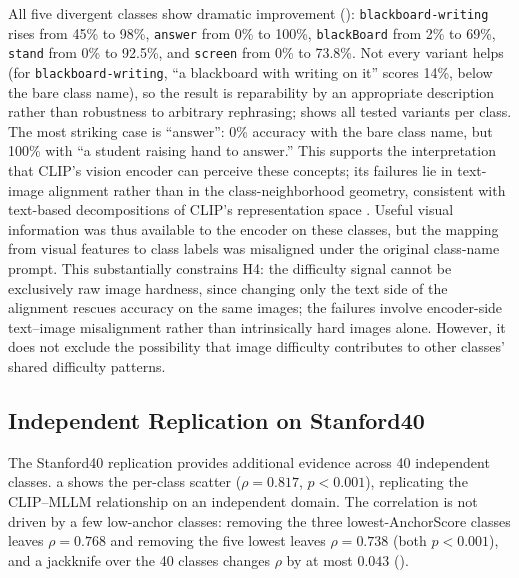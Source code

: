 \documentclass[a4paper,fleqn]{cas-sc}
\begin{document}
All five divergent classes show dramatic improvement (): \texttt{blackboard-writing} rises from 45\% to 98\%, \texttt{answer} from 0\% to 100\%, \texttt{blackBoard} from 2\% to 69\%, \texttt{stand} from 0\% to 92.5\%, and \texttt{screen} from 0\% to 73.8\%. Not every variant helps (for \texttt{blackboard-writing}, ``a blackboard with writing on it'' scores 14\%, below the bare class name), so the result is reparability by an appropriate description rather than robustness to arbitrary rephrasing;  shows all tested variants per class. The most striking case is ``answer'': 0\% accuracy with the bare class name, but 100\% with ``a student raising hand to answer.'' This supports the interpretation that CLIP's vision encoder can perceive these concepts; its failures lie in text-image alignment rather than in the class-neighborhood geometry, consistent with text-based decompositions of CLIP's representation space \cite{gandelsman2023interpreting}. Useful visual information was thus available to the encoder on these classes, but the mapping from visual features to class labels was misaligned under the original class-name prompt. This substantially constrains H4: the difficulty signal cannot be exclusively raw image hardness, since changing only the text side of the alignment rescues accuracy on the same images; the failures involve encoder-side text--image misalignment rather than intrinsically hard images alone. However, it does not exclude the possibility that image difficulty contributes to other classes' shared difficulty patterns.

\subsection{Independent Replication on Stanford40}
\label{sec:stanford40}

The Stanford40 replication provides additional evidence across 40 independent classes. a shows the per-class scatter ($\rho=0.817$, $p<0.001$), replicating the CLIP--MLLM relationship on an independent domain. The correlation is not driven by a few low-anchor classes: removing the three lowest-AnchorScore classes leaves $\rho=0.768$ and removing the five lowest leaves $\rho=0.738$ (both $p<0.001$), and a jackknife over the 40 classes changes $\rho$ by at most $0.043$ ().
\end{document}

